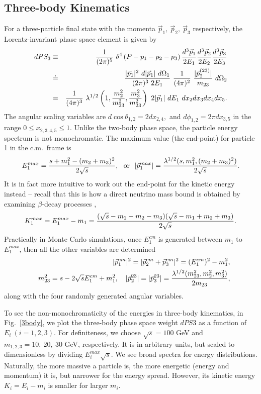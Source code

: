 \documentclass[12pt,prd,aps,floats,preprintnumbers,preprint,superscriptaddress,floatfix,nofootinbib]{revtex4}
\def\vp{{\vec p}}
\def\bea{\begin{eqnarray}}
\def\eea{\end{eqnarray}}
\begin{document}
\subsection{Three-body Kinematics}
\label{three-body}
For a three-particle final state with the momenta 
$\vp_1,\ \vp_2,\ \vp_3$ respectively, 
the Lorentz-invariant phase space element  is given by
\bea
\nonumber
dPS_3 &\equiv&  {1\over (2\pi)^5}\ 
\delta^4\left(P- p_1-p_2-p_3 \right) {d^3\vec p_1\over 2E_1}
  {d^3\vec p_2\over 2E_2}   {d^3\vec p_3\over 2E_3} \\
 &\doteq & {|\vp_1|^2\ d|\vp_1|\  d\Omega_1 \over (2\pi)^3\ 2E_1}\ 
 {1\over (4\pi)^2}\  {|\vp_2^{(23)}|\over m_{23}} \ d\Omega_2\\
 &= & {1\over (4\pi)^3}\ 
  \lambda^{1/2}\left(1,{m_2^2\over m^2_{23}},{m_3^2\over m^2_{23}}\right)\ {2 |\vp_1| }\ 
 dE_1\  dx_2 dx_3 dx_4 dx_5.
\eea
The angular scaling variables are  $d\cos\theta_{1,2}=2dx_{2,4},$
and $d\phi_{1,2}=2\pi dx_{3,5}$ in  the range $0\le x_{2,3,4,5} \le 1$.
Unlike the two-body phase space, the particle energy spectrum is not
monochromatic. The maximum value (the end-point) for particle 1 in the 
c.m.~frame is 
\bea
E_1^{max}={s+m_1^2-(m_2+m_3)^2\over 2\sqrt s} ,\ \  {\rm or}\ \ 
|\vp_1^{max}| ={\lambda^{1/2}(s,m_1^2,(m_2+m_3)^2)\over 2\sqrt s}.
\eea
It is in fact more intuitive to work out the end-point for the kinetic energy
instead -- recall that this is how a direct neutrino mass bound is obtained
by examining $\beta$-decay processes \cite{PDG},
\bea
K_1^{max}= E_1^{max} - m_1 = 
{(\sqrt s-m_1-m_2-m_3) (\sqrt s-m_1+m_2+m_3) \over 2\sqrt s}.
\eea
Practically in Monte Carlo simulations, once $E_1^{cm}$ is generated
between $m_1$ to $E_1^{max}$, then all the other variables are determined
\bea
\nonumber
&& |\vp_1^{cm}|^2 = |\vp_2^{cm}+\vp_3^{cm}|^2 = (E_1^{cm})^2 - m_1^2, \\ 
&& m_{23}^2 = s - 2\sqrt s E_1^{cm} + m_1^2,\quad 
|\vp_2^{23}| = |\vp_3^{23}|={\lambda^{1/2}(m_{23}^2,m_2^2,m_3^2)\over 2 m_{23}},
\nonumber
\eea
along with the four randomly generated angular variables.

To see the non-monochromaticity of the energies in three-body 
kinematics, in Fig.~\ref{3body}, we plot the three-body phase space 
weight $dPS3$ as a function of $E_i\ (i=1,2,3)$.
For definiteness, we choose $\sqrt s=100$ GeV and $m_{1,2,3}=10,\ 20,\ 30$
GeV, respectively. It is in arbitrary units, but scaled to dimensionless by
dividing $E_i^{max} \sqrt s$. We see broad spectra for  energy distributions. 
Naturally, the more massive a particle is, the more energetic 
(energy and momentum) it is, but narrower for the energy spread.  
However, its kinetic energy $K_i=E_i-m_i$ is smaller for larger $m_i$.
\end{document}
